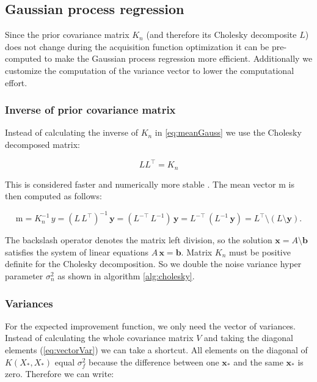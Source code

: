 \subsection{Gaussian process regression}

Since the prior covariance matrix $K_n$ (and therefore its Cholesky decomposite $L$) does not change during the acquisition function optimization it can be pre-computed to make the Gaussian process regression more efficient. Additionally we customize the computation of the variance vector to lower the computational effort.

\subsubsection{Inverse of prior covariance matrix}

Instead of calculating the inverse of $K_n$ in \eqref{eq:meanGauss} we use the Cholesky decomposed matrix:

$$LL^\top=K_n$$

This is considered faster and numerically more stable \cite{rasmussen2006gaussian}. The mean vector $\mathrm{m}$ is then computed as follows:

\begin{equation} \label{eq:regression}
    \mathrm{m} = K_n^{-1}\,y = (L\,L^{\top})^{-1}\,\mathbf{y} = (L^{-\top}\,L^{-1})\,\mathbf{y} = L^{-\top}\,(L^{-1}\,\mathbf{y}) = L^{\top}\setminus(L \setminus \mathbf{y}).
\end{equation}

The backslash operator denotes the matrix left division, so the solution $\mathbf{x}=A\setminus \mathbf{b}$ satisfies the system of linear equations $A\,\mathbf{x}=\mathbf{b}$.
Matrix $K_n$ must be positive definite for the Cholesky decomposition. So we double the noise variance hyper parameter $\sigma_n^2$ as shown in algorithm \ref{alg:cholesky}.

\subsubsection{Variances}

For the expected improvement function, we only need the vector of variances. Instead of calculating the whole covariance matrix $V$ and taking the diagonal elements (\ref{eq:vectorVar}) we can take a shortcut. All elements on the diagonal of $K(X_*,X_*)$ equal $\sigma_f^2$ because the difference between one $\mathbf{x}_*$ and the same $\mathbf{x}_*$ is zero. Therefore we can write:

